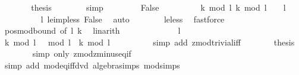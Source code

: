 \begin{isabellebody}
\ \ \ \ \isamarkupfalse%
\ \isamarkupfalse%
\ {\isacharquery}{\kern0pt}thesis\isanewline
\ \ \ \ \ \ \isamarkupfalse%
\ simp\isanewline
\ \ \isamarkupfalse%
\isanewline
\ \ \ \ \isamarkupfalse%
\ False\isanewline
\ \ \ \ \isamarkupfalse%
\ \isamarkupfalse%
\ {\isacartoucheopen}{}\ {\isacharless}{\kern0pt}\ k\ mod\ l{\isacartoucheclose}\ {\isacartoucheopen}k\ mod\ l\ {\isacharless}{\kern0pt}\ {}\ {\isacharplus}{\kern0pt}\ l{\isacartoucheclose}\isanewline
\ \ \ \ \ \ \isamarkupfalse%
\ {\isacartoucheopen}{}\ {\isacharless}{\kern0pt}\ l{\isacartoucheclose}\ le{\isacharunderscore}{\kern0pt}imp{\isacharunderscore}{\kern0pt}{}{\isacharunderscore}{\kern0pt}less\ False\ \isamarkupfalse%
\ auto\isanewline
\ \ \ \ \ \ \isamarkupfalse%
\ le{\isacharunderscore}{\kern0pt}less\ \isamarkupfalse%
\ fastforce\isanewline
\ \ \ \ \ \ \isamarkupfalse%
\ pos{\isacharunderscore}{\kern0pt}mod{\isacharunderscore}{\kern0pt}bound\ {\isacharbrackleft}{\kern0pt}of\ l\ k{\isacharbrackright}{\kern0pt}\ \isamarkupfalse%
\ linarith\ \isanewline
\ \ \ \ \ \ \isamarkupfalse%
\isanewline
\ \ \ \ \isamarkupfalse%
\ {\isacartoucheopen}l\ {\isachargreater}{\kern0pt}\ {}{\isacartoucheclose}\ \isamarkupfalse%
\ {\isacartoucheopen}{\isacharparenleft}{\kern0pt}k\ mod\ l\ {\isacharminus}{\kern0pt}\ {}{\isacharparenright}{\kern0pt}\ mod\ l\ {\isacharequal}{\kern0pt}\ k\ mod\ l\ {\isacharminus}{\kern0pt}\ {}{\isacartoucheclose}\isanewline
\ \ \ \ \ \ \isamarkupfalse%
\ {\isacharparenleft}{\kern0pt}simp\ add{\isacharcolon}{\kern0pt}\ zmod{\isacharunderscore}{\kern0pt}trivial{\isacharunderscore}{\kern0pt}iff{\isacharparenright}{\kern0pt}\isanewline
\ \ \ \ \isamarkupfalse%
\ \isamarkupfalse%
\ {\isacharquery}{\kern0pt}thesis\isanewline
\ \ \ \ \ \ \isamarkupfalse%
\ {\isacharparenleft}{\kern0pt}simp\ only{\isacharcolon}{\kern0pt}\ zmod{\isacharunderscore}{\kern0pt}zminus{}{\isacharunderscore}{\kern0pt}eq{\isacharunderscore}{\kern0pt}if{\isacharparenright}{\kern0pt}\isanewline
\ \ \ \ \ \ \isamarkupfalse%
\ {\isacharparenleft}{\kern0pt}simp\ add{\isacharcolon}{\kern0pt}\ mod{\isacharunderscore}{\kern0pt}eq{\isacharunderscore}{\kern0pt}{}{\isacharunderscore}{\kern0pt}iff{\isacharunderscore}{\kern0pt}dvd\ algebra{\isacharunderscore}{\kern0pt}simps\ mod{\isacharunderscore}{\kern0pt}simps{\isacharparenright}{\kern0pt}\isanewline

\end{isabellebody}
